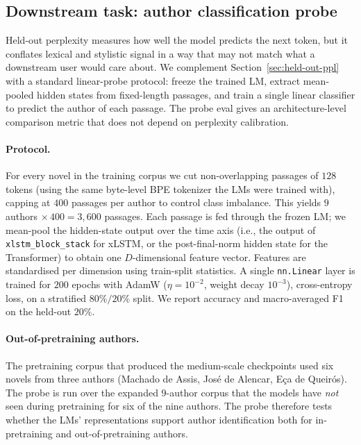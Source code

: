 \documentclass[11pt]{article}
\begin{document}
\subsection{Downstream task: author classification probe}\label{sec:probe}

Held-out perplexity measures how well the model predicts the next token,
but it conflates lexical and stylistic signal in a way that may not
match what a downstream user would care about. We complement
Section~\ref{sec:held-out-ppl} with a standard linear-probe protocol:
freeze the trained LM, extract mean-pooled hidden states from
fixed-length passages, and train a single linear classifier to predict
the author of each passage. The probe eval gives an architecture-level
comparison metric that does not depend on perplexity calibration.

\paragraph{Protocol.}
For every novel in the training corpus we cut non-overlapping passages
of $128$ tokens (using the same byte-level BPE tokenizer the LMs were
trained with), capping at $400$ passages per author to control class
imbalance. This yields $9$ authors $\times\, 400 = 3{,}600$ passages.
Each passage is fed through the frozen LM; we mean-pool the
hidden-state output over the time axis (i.e., the output of
\texttt{xlstm\_block\_stack} for xLSTM, or the post-final-norm hidden
state for the Transformer) to obtain one $D$-dimensional feature vector.
Features are standardised per dimension using train-split statistics. A
single \texttt{nn.Linear} layer is trained for $200$ epochs with AdamW
($\eta = 10^{-2}$, weight decay $10^{-3}$), cross-entropy loss, on a
stratified $80\%/20\%$ split. We report accuracy and macro-averaged F1
on the held-out $20\%$.

\paragraph{Out-of-pretraining authors.}
The pretraining corpus that produced the medium-scale checkpoints used
six novels from three authors (Machado de Assis, José de Alencar, Eça
de Queirós). The probe is run over the expanded $9$-author corpus that
the models have \emph{not} seen during pretraining for six of the nine
authors. The probe therefore tests whether the LMs' representations
support author identification both for in-pretraining and
out-of-pretraining authors.
\end{document}
